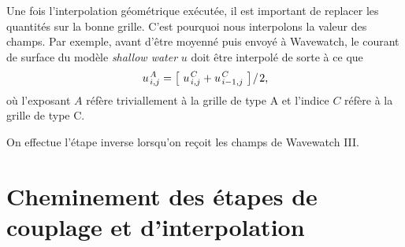 \documentclass[10pt]{report}
\numberwithin{equation}{section}
\newcommand{\pt}{\hspace{1pt}} %
\begin{document}
Une fois l'interpolation géométrique exécutée, il est important de replacer les quantités sur la bonne grille.
C'est pourquoi nous interpolons la valeur des champs.
Par exemple, avant d'être moyenné puis envoyé à Wavewatch, le courant de surface du modèle \emph{shallow water} \(u\) doit être interpolé de sorte à ce que
\begin{equation}
\label{eq:orge6e2f2d}
   u^{\pt A}_{\pt i,j} = \qty[\ u^{\pt C}_{\pt i,j} + u^{\pt C}_{\pt i-1,j}\ ]\pt/\pt2,
\end{equation}
où l'exposant \(A\) réfère triviallement à la grille de type A et l'indice \(C\) réfère à la grille de type C.\bigskip

On effectue l'étape inverse lorsqu'on reçoit les champs de Wavewatch III.

\section{Cheminement des étapes de couplage et d'interpolation}
\label{sec:orgb772ca9}
\end{document}
